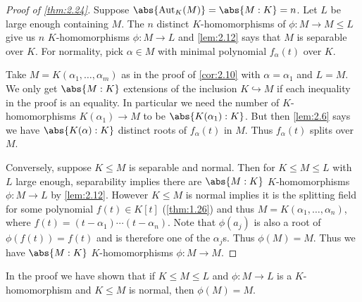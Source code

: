 \documentclass{article}
\DeclareMathOperator{\Aut}{Aut}
\begin{document}
\begin{proof}[Proof of \cref{thm:2.24}]
    Suppose $\abs{\Aut_K(M)} = \abs{M:K} = n$. Let $L$ be large enough containing $M$.
    The $n$ distinct $K$-homomorphisms of $\phi: M \to M \leq L$ give us $n$ $K$-homomorphisms $\phi:M \to L$ and \cref{lem:2.12} says that $M$ is separable over $K$.
    For normality, pick $\alpha \in M$ with minimal polynomial $f_\alpha(t)$ over $K$.

    Take $M = K(\alpha_1, \dotsc, \alpha_m)$ as in the proof of \cref{cor:2.10} with $\alpha = \alpha_1$ and $L = M$.
    We only get $\abs{M:K}$ extensions of the inclusion $K \hookrightarrow M$ if each inequality in the proof is an equality.
    In particular we need the number of $K$-homomorphisms $K(\alpha_1) \to M$ to be $\abs{K(\alpha_1):K}$.
    But then \cref{lem:2.6} says we have $\abs{K(\alpha):K}$ distinct roots of $f_\alpha(t)$ in $M$.
    Thus $f_\alpha(t)$ splits over $M$.


    Conversely, suppose $K \leq M$ is separable and normal.
    Then for $K \leq M \leq L$ with $L$ large enough, separability implies there are $\abs{M:K}$ $K$-homomorphisms $\phi:M \to L$ by \cref{lem:2.12}.
    However $K \leq M$ is normal implies it is the splitting field for some polynomial $f(t) \in K[t]$ (\cref{thm:1.26}) and thus $M = K(\alpha_1, \dotsc, \alpha_n)$, where $f(t) = (t - \alpha_1) \dotsm (t - \alpha_n)$.
    Note that $\phi(a_j)$ is also a root of $\phi(f(t)) = f(t)$ and is therefore one of the $\alpha_j$s.
    Thus $\phi(M) = M$. Thus we have $\abs{M:K}$ $K$-homomorphisms $\phi:M \to M$.
\end{proof}

\begin{remark}\label{rem:2.27}
    In the proof we have shown that if $K \leq M \leq L$ and $\phi:M \to L$ is a $K$-homomorphism and $K \leq M$ is normal, then $\phi(M) = M$.
\end{remark}
\end{document}
